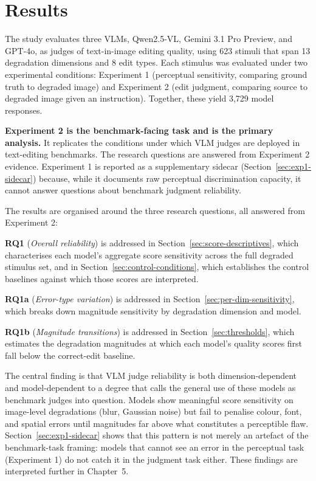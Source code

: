 \chapter{Results} \label{Results}

The study evaluates three VLMs, Qwen2.5-VL, Gemini 3.1 Pro Preview, and GPT-4o, as judges of text-in-image editing quality, using 623 stimuli that span 13 degradation dimensions and 8 edit types. Each stimulus was evaluated under two experimental conditions: Experiment 1 (perceptual sensitivity, comparing ground truth to degraded image) and Experiment 2 (edit judgment, comparing source to degraded image given an instruction). Together, these yield 3,729 model responses.

\textbf{Experiment 2 is the benchmark-facing task and is the primary analysis.} It replicates the conditions under which VLM judges are deployed in text-editing benchmarks. The research questions are answered from Experiment 2 evidence. Experiment 1 is reported as a supplementary sidecar (Section~\ref{sec:exp1-sidecar}) because, while it documents raw perceptual discrimination capacity, it cannot answer questions about benchmark judgment reliability.

The results are organised around the three research questions, all answered from Experiment 2:

\textbf{RQ1} (\textit{Overall reliability}) is addressed in Section~\ref{sec:score-descriptives}, which characterises each model's aggregate score sensitivity across the full degraded stimulus set, and in Section~\ref{sec:control-conditions}, which establishes the control baselines against which those scores are interpreted.

\textbf{RQ1a} (\textit{Error-type variation}) is addressed in Section~\ref{sec:per-dim-sensitivity}, which breaks down magnitude sensitivity by degradation dimension and model.

\textbf{RQ1b} (\textit{Magnitude transitions}) is addressed in Section~\ref{sec:thresholds}, which estimates the degradation magnitudes at which each model's quality scores first fall below the correct-edit baseline.

The central finding is that VLM judge reliability is both dimension-dependent and model-dependent to a degree that calls the general use of these models as benchmark judges into question. Models show meaningful score sensitivity on image-level degradations (blur, Gaussian noise) but fail to penalise colour, font, and spatial errors until magnitudes far above what constitutes a perceptible flaw. Section~\ref{sec:exp1-sidecar} shows that this pattern is not merely an artefact of the benchmark-task framing: models that cannot see an error in the perceptual task (Experiment 1) do not catch it in the judgment task either. These findings are interpreted further in Chapter~5.


